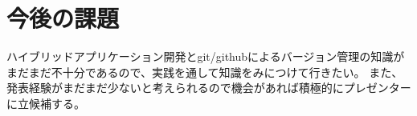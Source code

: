 \section{今後の課題}
ハイブリッドアプリケーション開発とgit/githubによるバージョン管理の知識が
まだまだ不十分であるので、実践を通して知識をみにつけて行きたい。
また、発表経験がまだまだ少ないと考えられるので機会があれば積極的にプレゼンターに立候補する。
